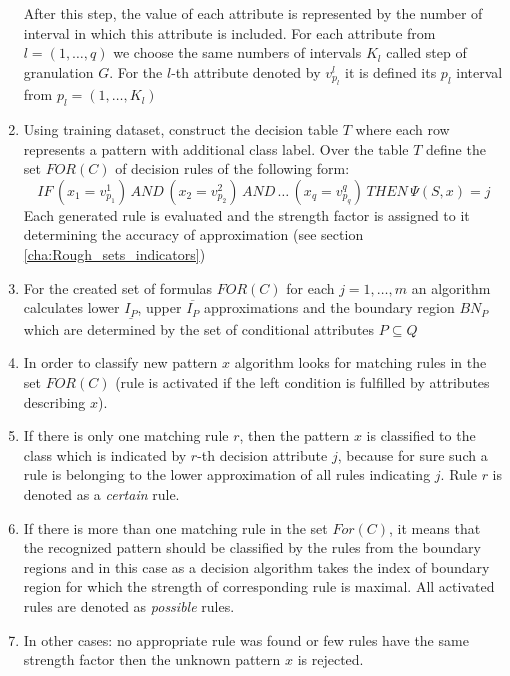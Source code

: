 \begin{enumerate}
        After this step, the value of each attribute is represented 
        by the number of interval in which this attribute is included. For each
        attribute from $l=(1, \ldots , q)$ we choose the same numbers of
        intervals $K_l$ called step of granulation $G$. For the $l$-th attribute 
        denoted by $v^l_{p_l}$ it is defined its $p_l$ interval from $p_l=(1, \ldots, K_l)$
    \item Using training dataset, construct the decision table $T$ where each
        row represents a pattern with additional class label. 
        Over the table $T$ define the set $FOR(C)$ of decision rules of
        the following form:
        $$IF \, (x_1 = v_{p_1}^1) \, AND \, (x_2=v_{p_2}^2) \, AND \, \ldots \,
        (x_q=v_{p_q}^q) \, THEN \, \Psi(S, x)=j$$
        Each generated rule is evaluated and the strength factor is assigned to
        it determining the accuracy of approximation (see section \ref{cha:Rough_sets_indicators})
    \item For the created set of formulas $FOR(C)$ for each $j=1, \ldots, m$
        an algorithm calculates lower $\underline{I_P}$, upper $\overline{I_P}$ approximations and the boundary
        region $BN_P$ which are determined by the set of conditional attributes $P
        \subseteq Q$ 
    \item In order to classify new pattern $x$ algorithm looks for matching rules in the
        set $FOR(C)$ (rule is activated if the left condition is fulfilled by
        attributes describing $x$).
    \item If there is only one matching rule $r$, then the pattern $x$ is
        classified to the class which is indicated by $r$-th decision attribute $j$, 
        because for sure such a rule is belonging to the lower approximation of all rules 
        indicating $j$. Rule $r$ is denoted as a \textit{certain} rule.
    \item If there is more than one matching rule in the set $For(C)$, 
        it means that the recognized pattern should be classified by the 
        rules from the boundary regions and in this case as a decision
        algorithm takes the index of boundary region for which the strength of corresponding 
        rule is maximal. All activated rules are denoted as \textit{possible}
        rules.
    \item In other cases: no appropriate rule was found or few rules have the same strength
        factor then the unknown pattern $x$ is rejected.
\end{enumerate}
